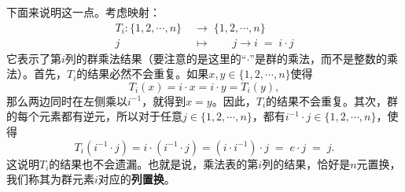 \documentclass[12pt,UTF8,fontset=none]{ctexbook}
\begin{document}
\begin{table}[htbp]
    \caption{\texttt{矩群$\mathfrak{J}_4$的乘法表。每列都可以看作一个置换。}}
\end{table}

下面来说明这一点。考虑映射：
\begin{align*}
    T_i: \{1,2,\cdots,n\} \; &\longrightarrow \; \{1,2,\cdots,n\}\\
    j \qquad\quad &\longmapsto \qquad j\rightarrow i \; = \;i\cdot j
\end{align*}
它表示了第$i$列的群乘法结果（要注意的是这里的“$\cdot$”是群的乘法，而不是整数的乘法）。首先，$T_i$的结果必然不会重复。如果$x,y\in\{1,2,\cdots,n\}$使得
$$ T_i(x) = i\cdot x = i\cdot y = T_i(y),$$
那么两边同时在左侧乘以$i^{-1}$，就得到$x=y$。因此，$T_i$的结果不会重复。其次，群的每个元素都有逆元，所以对于任意$j\in\{1,2,\cdots,n\}$，都有$i^{-1}\cdot j \in\{1,2,\cdots,n\}$，使得
$$T_i(i^{-1}\cdot j) = i\cdot(i^{-1}\cdot j) = (i\cdot i^{-1})\cdot j \; = \; e\cdot j \; = \; j.$$
这说明$T_i$的结果也不会遗漏。也就是说，乘法表的第$i$列的结果，恰好是$n$元置换，我们称其为群元素$i$对应的\textbf{列置换}。
\end{document}
